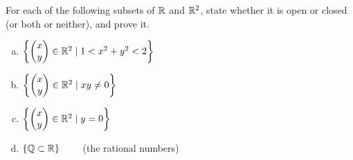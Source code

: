 For each of the following subsets of $\mathbb{R}$ and $\mathbb{R}^2$, state whether it is open or closed (or both or neither), and prove it.
\begin{enumerate}[a.]
	\item $\left\{ \begin{pmatrix} x \\ y \end{pmatrix} \in \mathbb{R}^2 \mid 1 < x^2+y^2 < 2 \right\}$ \\
	\item $\left\{ \begin{pmatrix} x \\ y \end{pmatrix} \in \mathbb{R}^2 \mid xy\neq 0 \right\}$ \\
	\item $\left\{ \begin{pmatrix} x \\ y \end{pmatrix} \in \mathbb{R}^2 \mid y=0 \right\}$
	\item $\left\{ \mathbb{Q} \subset \mathbb{R} \right\}\qquad$ (the rational numbers)
\end{enumerate}
